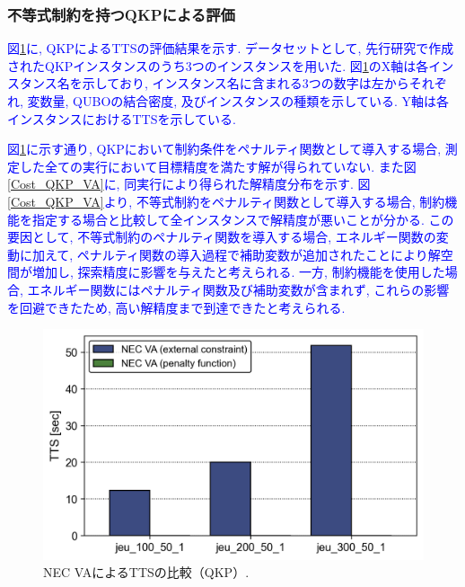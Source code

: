 \documentclass[submit,techrep,noauthor]{ipsj}
\begin{document}
\subsubsection{不等式制約を持つQKPによる評価}
\textcolor{blue}{図\ref{TTS_QKP_VA}に, QKPによるTTSの評価結果を示す. データセットとして, 先行研究\cite{qkplib}で作成されたQKPインスタンスのうち3つのインスタンスを用いた. 図\ref{TTS_QKP_VA}のX軸は各インスタンス名を示しており, インスタンス名に含まれる3つの数字は左からそれぞれ, 変数量, QUBOの結合密度, 及びインスタンスの種類を示している. Y軸は各インスタンスにおけるTTSを示している. }

\textcolor{blue}{図\ref{TTS_QKP_VA}に示す通り, QKPにおいて制約条件をペナルティ関数として導入する場合, 測定した全ての実行において目標精度を満たす解が得られていない. また図\ref{Cost_QKP_VA}に, 同実行により得られた解精度分布を示す. 図\ref{Cost_QKP_VA}より, 不等式制約をペナルティ関数として導入する場合, 制約機能を指定する場合と比較して全インスタンスで解精度が悪いことが分かる. この要因として, 不等式制約のペナルティ関数を導入する場合, エネルギー関数の変動に加えて, ペナルティ関数の導入過程で補助変数が追加されたことにより解空間が増加し, 探索精度に影響を与えたと考えられる. 一方, 制約機能を使用した場合, エネルギー関数にはペナルティ関数及び補助変数が含まれず, これらの影響を回避できたため, 高い解精度まで到達できたと考えられる.}

\begin{figure}[t]
\centering
\includegraphics[bb=0 0 700 230, width=15cm]{TTS_QKP_VA.png}
\caption{NEC VAによるTTSの比較（QKP）.}
\label{TTS_QKP_VA}
\end{figure}
\end{document}

